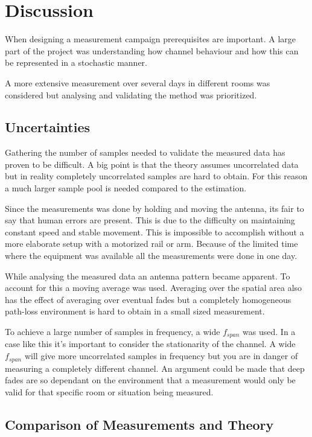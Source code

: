 \chapter{Discussion}

When designing a measurement campaign prerequisites are important. A large part of the project was understanding how channel behaviour and how this can be represented in a stochastic manner.

A more extensive measurement over several days in different rooms was considered but analysing and validating the method was prioritized.

\section{Uncertainties}

Gathering the number of samples needed to validate the measured data has proven to be difficult. A big point is that the theory assumes uncorrelated data but in reality completely uncorrelated samples are hard to obtain. For this reason a much larger sample pool is needed compared to the estimation. 

Since the measurements was done by holding and moving the antenna, its fair to say that human errors are present. This is due to the difficulty on maintaining constant speed and stable movement. This is impossible to accomplish without a more elaborate setup with a motorized rail or arm. Because of the limited time where the equipment was available all the measurements were done in one day.

While analysing the measured data an antenna pattern became apparent. To account for this a moving average was used. Averaging over the spatial area also has the effect of averaging over eventual fades but a completely homogeneous path-loss environment is hard to obtain in a small sized measurement.

To achieve a large number of samples in frequency, a wide $f_{span}$ was used. In a case like this it's important to consider the stationarity of the channel. A wide $f_{span}$ will give more uncorrelated samples in frequency but you are in danger of measuring a completely different channel. An argument could be made that deep fades are so dependant on the environment that a measurement would only be valid for that specific room or situation being measured.

\section{Comparison of Measurements and Theory}